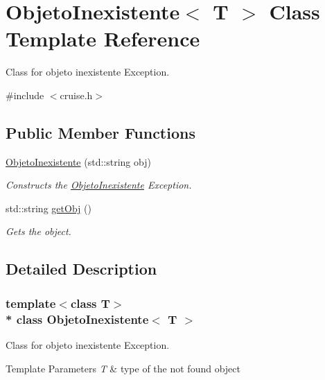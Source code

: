 \hypertarget{classObjetoInexistente}{}\section{Objeto\+Inexistente$<$ T $>$ Class Template Reference}
\label{classObjetoInexistente}


Class for objeto inexistente Exception.  




{\ttfamily \#include $<$cruise.\+h$>$}

\subsection*{Public Member Functions}
\begin{DoxyCompactItemize}
\item 
\hyperlink{classObjetoInexistente_a3f398b277ac2ca56faed5f1183607332}{Objeto\+Inexistente} (std\+::string obj)
\begin{DoxyCompactList}\small\item\em Constructs the \hyperlink{classObjetoInexistente}{Objeto\+Inexistente} Exception. \end{DoxyCompactList}\item 
std\+::string \hyperlink{classObjetoInexistente_ae43ef3bc4f862eed4afbc961b0691093}{get\+Obj} ()
\begin{DoxyCompactList}\small\item\em Gets the object. \end{DoxyCompactList}\end{DoxyCompactItemize}


\subsection{Detailed Description}
\subsubsection*{template$<$class T$>$\\*
class Objeto\+Inexistente$<$ T $>$}

Class for objeto inexistente Exception. 


\begin{DoxyTemplParams}{Template Parameters}
{\em T} & type of the not found object \\
\hline
\end{DoxyTemplParams}


